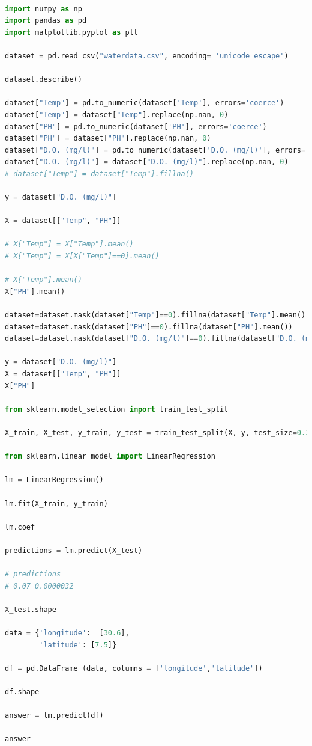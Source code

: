 \begin{lstlisting}[language=python, caption={Linear regression Model Scikit}]

import numpy as np
import pandas as pd
import matplotlib.pyplot as plt

dataset = pd.read_csv("waterdata.csv", encoding= 'unicode_escape')

dataset.describe()

dataset["Temp"] = pd.to_numeric(dataset['Temp'], errors='coerce')
dataset["Temp"] = dataset["Temp"].replace(np.nan, 0)
dataset["PH"] = pd.to_numeric(dataset['PH'], errors='coerce')
dataset["PH"] = dataset["PH"].replace(np.nan, 0)
dataset["D.O. (mg/l)"] = pd.to_numeric(dataset['D.O. (mg/l)'], errors='coerce')
dataset["D.O. (mg/l)"] = dataset["D.O. (mg/l)"].replace(np.nan, 0)
# dataset["Temp"] = dataset["Temp"].fillna()

y = dataset["D.O. (mg/l)"]

X = dataset[["Temp", "PH"]]

# X["Temp"] = X["Temp"].mean()
# X["Temp"] = X[X["Temp"]==0].mean()

# X["Temp"].mean()
X["PH"].mean()

dataset=dataset.mask(dataset["Temp"]==0).fillna(dataset["Temp"].mean())
dataset=dataset.mask(dataset["PH"]==0).fillna(dataset["PH"].mean())
dataset=dataset.mask(dataset["D.O. (mg/l)"]==0).fillna(dataset["D.O. (mg/l)"].mean())

y = dataset["D.O. (mg/l)"]
X = dataset[["Temp", "PH"]]
X["PH"]

from sklearn.model_selection import train_test_split

X_train, X_test, y_train, y_test = train_test_split(X, y, test_size=0.3, random_state=101)

from sklearn.linear_model import LinearRegression

lm = LinearRegression()

lm.fit(X_train, y_train)

lm.coef_

predictions = lm.predict(X_test)

# predictions
# 0.07 0.0000032

X_test.shape

data = {'longitude':  [30.6],
        'latitude': [7.5]}

df = pd.DataFrame (data, columns = ['longitude','latitude'])

df.shape

answer = lm.predict(df)

answer


\end{lstlisting}\\

